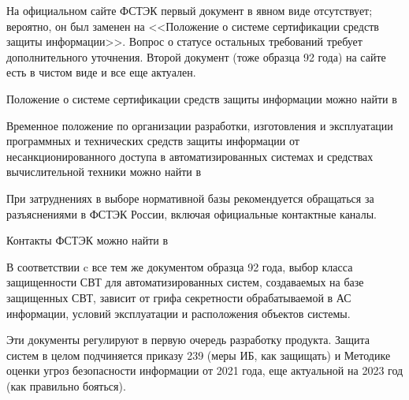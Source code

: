 На официальном сайте ФСТЭК первый документ в явном виде отсутствует; вероятно, он был заменен на <<Положение о системе сертификации средств защиты информации>>. Вопрос о статусе остальных требований требует дополнительного уточнения. Второй документ (тоже образца 92 года) на сайте есть в чистом виде и все еще актуален.

Положение о системе сертификации средств защиты информации можно найти в \cite{FSTECCertificationSystem}

Временное положение по организации разработки, изготовления и эксплуатации программных и технических средств защиты информации от несанкционированного доступа в автоматизированных системах и средствах вычислительной техники можно найти в \cite{GTKTemporaryRegulation}

При затруднениях в выборе нормативной базы рекомендуется обращаться за разъяснениями в ФСТЭК России, включая официальные контактные каналы.

Контакты ФСТЭК можно найти в \cite{FSTECContacts}

В соответствии c все тем же документом образца 92 года, выбор класса защищенности СВТ для автоматизированных систем, создаваемых на базе защищенных СВТ, зависит от грифа секретности обрабатываемой в АС информации, условий эксплуатации и расположения объектов системы.

Эти документы регулируют в первую очередь разработку продукта. Защита систем в целом подчиняется приказу 239 (меры ИБ, как защищать) и Методике оценки угроз безопасности информации от 2021 года, еще актуальной на 2023 год (как правильно бояться).

